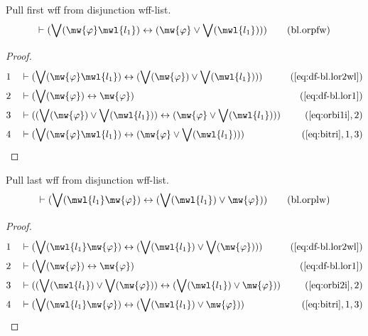 \begin{lemma} {Pull first wff from disjunction wff-list.}
\begin{align}
\vdash ( \bigvee( \mw{\varphi} \mwl{l_1} ) \leftrightarrow ( \mw{\varphi} \vee
    \bigvee( \mwl{l_1} ) ) )\label{eq:bl.orpfw}\tag{bl.orpfw}
\end{align}
\end{lemma}


\begin{proof}
\begin{align}
  1 &&  & \vdash ( \bigvee( \mw{\varphi} \mwl{l_1} ) \leftrightarrow ( \bigvee(
     \mw{\varphi} ) \vee \bigvee( \mwl{l_1} ) )
     )&(\mbox{\ref{eq:df-bl.lor2wl}})\notag
  \\ 2 &&  & \vdash ( \bigvee( \mw{\varphi} ) \leftrightarrow \mw{\varphi}
     )&(\mbox{\ref{eq:df-bl.lor1}})\notag
  \\ 3 &&  & \vdash ( ( \bigvee( \mw{\varphi} ) \vee \bigvee( \mwl{l_1} ) )
     \leftrightarrow ( \mw{\varphi} \vee \bigvee(
     \mwl{l_1} ) ) )&(\mbox{\ref{eq:orbi1i}},2)\notag
  \\ 4 &&  & \vdash ( \bigvee( \mw{\varphi} \mwl{l_1} ) \leftrightarrow (
     \mw{\varphi} \vee \bigvee( \mwl{l_1} ) )
     )&(\mbox{\ref{eq:bitri}},1,3)\notag
\end{align}
\end{proof}

\begin{lemma} {Pull last wff from disjunction wff-list.}
\begin{align}
\vdash ( \bigvee( \mwl{l_1} \mw{\varphi} ) \leftrightarrow ( \bigvee( \mwl{l_1}
    ) \vee \mw{\varphi} ) )\label{eq:bl.orplw}\tag{bl.orplw}
\end{align}
\end{lemma}


\begin{proof}
\begin{align}
  1 &&  & \vdash ( \bigvee( \mwl{l_1} \mw{\varphi} ) \leftrightarrow ( \bigvee(
     \mwl{l_1} ) \vee \bigvee( \mw{\varphi} ) )
     )&(\mbox{\ref{eq:df-bl.lor2wl}})\notag
  \\ 2 &&  & \vdash ( \bigvee( \mw{\varphi} ) \leftrightarrow \mw{\varphi}
     )&(\mbox{\ref{eq:df-bl.lor1}})\notag
  \\ 3 &&  & \vdash ( ( \bigvee( \mwl{l_1} ) \vee \bigvee( \mw{\varphi} ) )
     \leftrightarrow ( \bigvee( \mwl{l_1} ) \vee
     \mw{\varphi} ) )&(\mbox{\ref{eq:orbi2i}},2)\notag
  \\ 4 &&  & \vdash ( \bigvee( \mwl{l_1} \mw{\varphi} ) \leftrightarrow (
     \bigvee( \mwl{l_1} ) \vee \mw{\varphi} )
     )&(\mbox{\ref{eq:bitri}},1,3)\notag
\end{align}
\end{proof}


